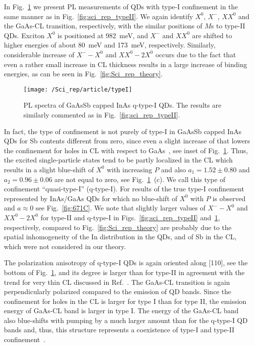 In Fig.~\ref{fig:scirep_typeIq} we present PL measurements of QDs with type-I confinement in the same manner as in Fig.~\ref{fig:sci_rep_typeII}. We again identify $X^0$, $X^-$, $XX^0$ and the GaAs-CL transition, respectively, with the similar positions of $M$s to type-II QDs. Exciton $X^0$ is positioned at 982~meV, and $X^-$ and $XX^0$ are shifted to higher energies of about 80~meV and 173~meV, respectively. Similarly, considerable increase of $X^--X^0$ and $XX^0-2X^0$ occurs due to the fact that even a rather small increase in CL thickness results in a large increase of binding energies, as can be seen in Fig.~\ref{fig:Sci_rep_theory}. 
%
\begin{figure}
	\centering
	\texttt{[image: /Sci\_rep/article/typeI]}
	\caption{PL spectra of GaAsSb capped InAs q-type-I QDs. The results are similarly commented as in Fig.~\ref{fig:sci_rep_typeII}.}
	\label{fig:scirep_typeIq}
\end{figure}
%
In fact, the type of confinement is not purely of type-I in GaAsSb capped InAs QDs for Sb contents different from zero, since even a slight increase of that lowers the confinement for holes in CL with respect to GaAs~\cite{Klenovsky10}, see inset of Fig.~\ref{fig:scirep_typeIq}. Thus, the excited single-particle states tend to be partly localized in the CL which results in a slight blue-shift of $X^0$ with increasing $P$ and also $a_1=1.52\pm0.80$ and $a_2=0.96\pm0.06$ are not equal to zero, see Fig.~\ref{fig:scirep_typeIq}~(c). We call this type of confinement \enquote{quasi-type-I} (q-type-I). For results of the true type-I confinement represented by InAs/GaAs QDs for which no blue-shift of $X^0$ with $P$ is observed and $a\approx0$ see Fig.~\ref{fig:671C}. We note that slightly larger values of $X^--X^0$ and $XX^0-2X^0$ for type-II and q-type-I in Figs.~\ref{fig:sci_rep_typeII} and~\ref{fig:scirep_typeIq}, respectively, compared to Fig.~\ref{fig:Sci_rep_theory} are probably due to the spatial inhomogeneity of the In distribution in the QDs, and of Sb in the CL, which were not considered in our theory. 

The polarization anisotropy of q-type-I QDs is again oriented along [110], see the bottom of Fig.~\ref{fig:scirep_typeIq}, and its degree is larger than for type-II in agreement with the trend for very thin CL discussed in Ref.~\citep{Klenovsky2017}. The GaAs-CL transition is again perpendicularly polarized compared to the emission of QD bands. Since the confinement for holes in the CL is larger for type I than for type II, the emission energy of GaAs-CL band is larger in type I. The energy of the GaAs-CL band also blue-shifts with pumping by a much larger amount than for the q-type-I QD bands and, thus, this structure represents a coexistence of type-I and type-II confinement~\cite{Ji2015}.


